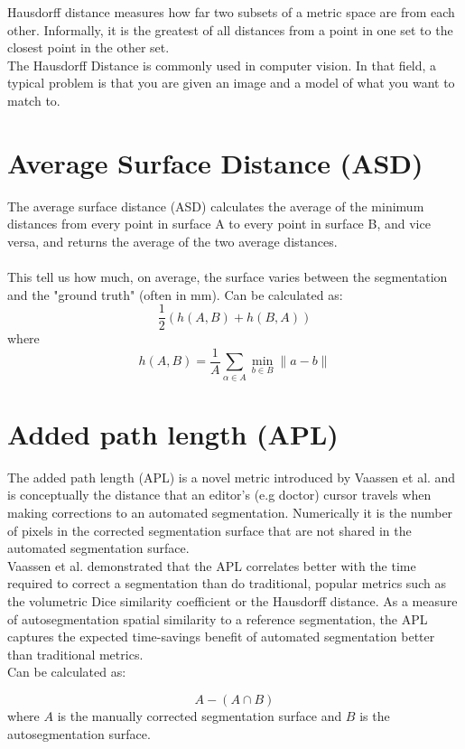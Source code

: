 \documentclass[a4paper, 11pt]{report}
\begin{document}
Hausdorff distance measures how far two subsets of a metric space are from each other. Informally, it is the greatest of all distances from a point in one set to the closest point in the other set.  \\

The Hausdorff Distance is commonly used in computer vision. In that field, a typical
problem is that you are given an image and a model of what you want to match to.

\section*{Average Surface Distance (ASD)}

The average surface distance (ASD)  calculates the average of the minimum distances from every point in surface A to every
point in surface B, and vice versa, and returns the average of the two average distances. 
\\\\This tell us how much, on average, the surface varies between the segmentation and the "ground truth" (often in mm). Can be calculated as:
$$
\frac{1}{2}(h(A, B)+h(B, A))
$$
where
$$
h(A, B)=\frac{1}{A} \sum_{\alpha \in A} \min _{b \in B}\|a-b\|
$$
\section*{Added path length (APL)}
The added path length (APL) is a novel metric introduced by Vaassen et al. and is conceptually the distance that an editor's (e.g doctor) cursor travels when making corrections to an automated segmentation. Numerically it is the number of pixels in the corrected segmentation surface that are not shared in the automated segmentation surface. \\

Vaassen et al. demonstrated that the APL correlates better with the time required to correct a segmentation than do traditional, popular metrics such as the volumetric Dice similarity coefficient or the Hausdorff distance. As a measure of autosegmentation spatial similarity to a reference segmentation, the APL captures the expected time-savings benefit of automated segmentation better than traditional metrics. \\

Can be calculated as: 

$$
A-(A \cap B)
$$
where $A$ is the manually corrected segmentation surface and $B$ is the autosegmentation surface.\\
\end{document}
